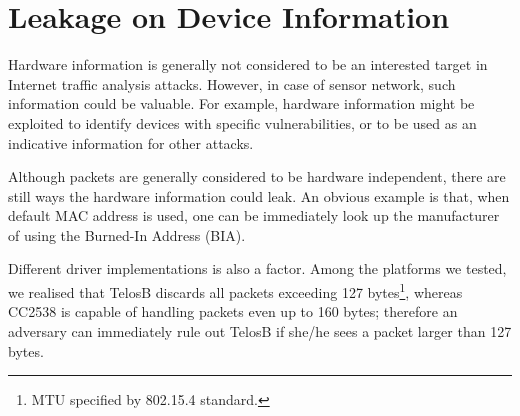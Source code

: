 \section{Leakage on Device Information}


Hardware information is generally not considered to be an interested target in Internet traffic analysis attacks. However, in case of sensor network, such 
information could be valuable. For example, hardware information might be exploited to identify devices with specific vulnerabilities, or to be used as an indicative information for other attacks.

Although packets are generally considered to be hardware independent, there are still ways the hardware information could leak. An obvious example is that, when default MAC address is used, one can be immediately look up the manufacturer of using the Burned-In Address (BIA)\cite{BIA}.

Different driver implementations is also a factor. Among the platforms we tested, we realised that TelosB\cite{TelosB} discards all packets exceeding 127 bytes\footnote{MTU specified by 802.15.4 standard.}, whereas CC2538 is capable of handling packets even up to 160 bytes; therefore an adversary can immediately rule out TelosB if she/he sees a packet larger than 127 bytes.




